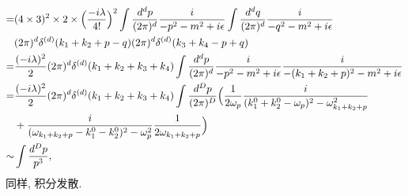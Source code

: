 \begin{itemize}
\begin{align}
		=& (4 \times 3)^2 \times 2 \times \Big( \frac{- i \lambda}{4!} \Big)^2 \int \frac{d^d p}{(2 \pi)^d} \frac{i}{- p^2 - m^2 + i \epsilon} \int \frac{d^d q}{(2 \pi)^d} \frac{i}{- q^2 - m^2 + i \epsilon} \notag \\
		& (2 \pi)^d \delta^{(d)}(k_1 + k_2 + p - q) (2 \pi)^d \delta^{(d)}(k_3 + k_4 - p + q) \label{Feynman diagrams.3.17} \\
		=& \frac{(- i \lambda)^2}{2} (2 \pi)^d \delta^{(d)}(k_1 + k_2 + k_3 + k_4) \int \frac{d^d p}{(2 \pi)^d} \frac{i}{- p^2 - m^2 + i \epsilon} \frac{i}{- (k_1 + k_2 + p)^2 - m^2 + i \epsilon} \notag \\
		=& \frac{(- i \lambda)^2}{2} (2 \pi)^d \delta^{(d)}(k_1 + k_2 + k_3 + k_4) \int \frac{d^D p}{(2 \pi)^D} \Big( \frac{1}{2 \omega_p} \frac{i}{(k_1^0 + k_2^0 - \omega_p)^2 - \omega_{k_1 + k_2 + p}^2} \notag \\
		& + \frac{i}{(\omega_{k_1 + k_2 + p} - k_1^0 - k_2^0)^2 - \omega_p^2} \frac{1}{2 \omega_{k_1 + k_2 + p}} \Big) \label{Feynman diagrams.3.18} \\
		\sim & \int \frac{d^D p}{p^3},
	\end{align}
	同样, 积分发散.
\end{itemize}
